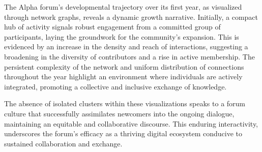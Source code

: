 \begin{minipage}[t]{0.25\textwidth}
  \vspace{8mm}
  \small
  The Alpha forum's developmental trajectory over its first year, as visualized through network graphs, reveals a dynamic growth narrative. Initially, a compact hub of activity signals robust engagement from a committed group of participants, laying the groundwork for the community's expansion. This is evidenced by an increase in the density and reach of interactions, suggesting a broadening in the diversity of contributors and a rise in active membership. The persistent complexity of the network and uniform distribution of connections throughout the year highlight an environment where individuals are actively integrated, promoting a collective and inclusive exchange of knowledge.

  \medskip
  The absence of isolated clusters within these visualizations speaks to a forum culture that successfully assimilates newcomers into the ongoing dialogue, maintaining an equitable and collaborative discourse. This enduring interactivity, underscores the forum's efficacy as a thriving digital ecosystem conducive to sustained collaboration and exchange.

\end{minipage}

